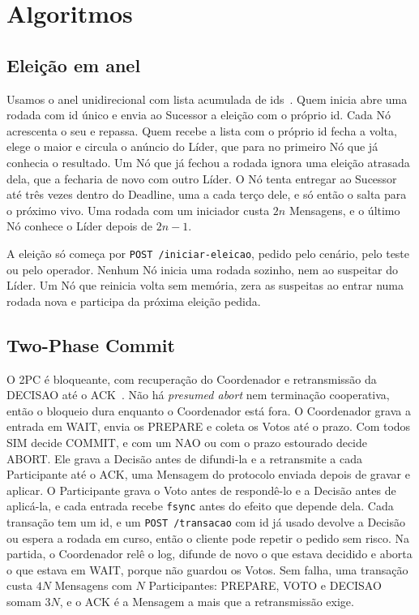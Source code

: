 \documentclass[conference]{IEEEtran}
\newcommand{\cod}[1]{\texttt{\upshape #1}}
\begin{document}
\section{Algoritmos}
\label{sec:algoritmos}

\subsection{Eleição em anel}
Usamos o anel unidirecional com lista acumulada de ids~\cite{vansteen}. Quem inicia abre uma
rodada com id único e envia ao Sucessor a eleição com o próprio id. Cada Nó acrescenta o seu e
repassa. Quem recebe a lista com o próprio id fecha a volta, elege o maior e circula o anúncio do
Líder, que para no primeiro Nó que já conhecia o resultado. Um Nó que já fechou a rodada ignora uma
eleição atrasada dela, que a fecharia de novo com outro Líder. O Nó tenta entregar ao Sucessor até
três vezes dentro do Deadline, uma a cada terço dele, e só então o salta para o próximo vivo. Uma
rodada com um iniciador custa $2n$ Mensagens, e o último Nó conhece o Líder depois de $2n-1$.

A eleição só começa por \cod{POST /iniciar-eleicao}, pedido pelo cenário, pelo teste ou pelo
operador. Nenhum Nó inicia uma rodada sozinho, nem ao suspeitar do Líder. Um Nó que reinicia volta
sem memória, zera as suspeitas ao entrar numa rodada nova e participa da próxima eleição pedida.

\subsection{Two-Phase Commit}
\label{sec:2pc}
O 2PC é bloqueante, com recuperação do Coordenador e retransmissão da DECISAO até o
ACK~\cite{vansteen}. Não há \emph{presumed abort} nem terminação cooperativa, então o bloqueio dura
enquanto o Coordenador está fora. O Coordenador grava a entrada em WAIT, envia os PREPARE e coleta
os Votos até o prazo. Com todos SIM decide COMMIT, e com um NAO ou com o prazo estourado decide
ABORT. Ele grava a Decisão antes de difundi-la e a retransmite a cada Participante até o ACK, uma
Mensagem do protocolo enviada depois de gravar e aplicar. O Participante grava o Voto antes de
respondê-lo e a Decisão antes de aplicá-la, e cada entrada recebe \cod{fsync} antes do efeito que
depende dela. Cada transação tem um id, e um \cod{POST /transacao} com id já usado devolve a
Decisão ou espera a rodada em curso, então o cliente pode repetir o pedido sem risco. Na partida, o
Coordenador relê o log, difunde de novo o que estava decidido e aborta o que estava em WAIT, porque
não guardou os Votos. Sem falha, uma transação custa $4N$ Mensagens com $N$ Participantes: PREPARE,
VOTO e DECISAO somam $3N$, e o ACK é a Mensagem a mais que a retransmissão exige.
\end{document}
